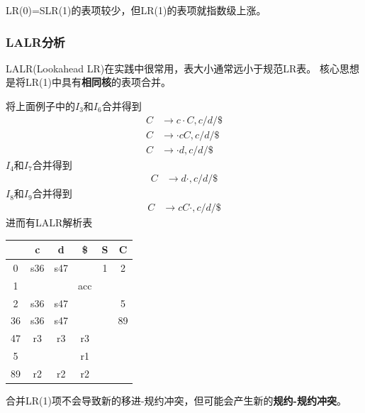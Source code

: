 LR(0)=SLR(1)的表项较少，但LR(1)的表项就指数级上涨。

\subsubsection{LALR分析}
LALR(Lookahead LR)在实践中很常用，表大小通常远小于规范LR表。
核心思想是将LR(1)中具有\textbf{相同核}的表项合并。

\begin{example}
将上面例子中的$I_3$和$I_6$合并得到
\[\begin{aligned}
C &\to c\cdot C, c/d/\$\\
C &\to \cdot cC, c/d/\$\\
C &\to \cdot d, c/d/\$
\end{aligned}\]
$I_4$和$I_7$合并得到
\[\begin{aligned}
C &\to d\cdot, c/d/\$
\end{aligned}\]
$I_8$和$I_9$合并得到
\[\begin{aligned}
C &\to cC\cdot, c/d/\$
\end{aligned}\]
进而有LALR解析表
\begin{center}
\begin{tabular}{|c|c|c|c|c|c|}\hline
   & c   & d   & \$  & S & C \\\hline
0  & s36 & s47 &     & 1 & 2 \\\hline
1  &     &     & acc &   &   \\\hline
2  & s36 & s47 &     &   & 5 \\\hline
36 & s36 & s47 &     &   & 89\\\hline
47 & r3  & r3  & r3  &   &   \\\hline
5  &     &     & r1  &   &   \\\hline
89 & r2  & r2  & r2  &   &   \\\hline
\end{tabular}
\end{center}
\end{example}

合并LR(1)项不会导致新的移进-规约冲突，但可能会产生新的\textbf{规约-规约冲突}。

